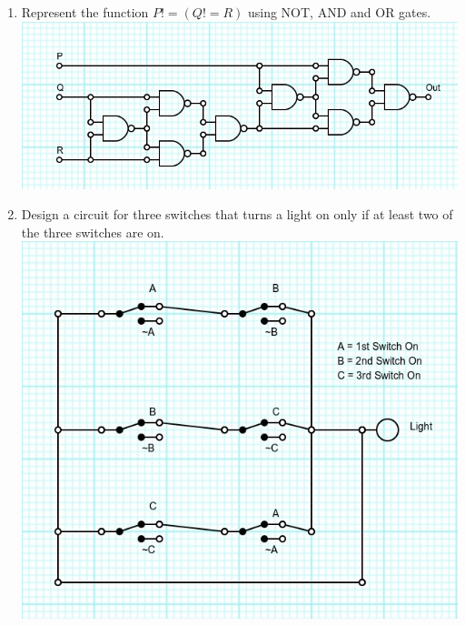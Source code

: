 \documentclass{article}
\begin{document}
\begin{enumerate}
    \newpage
    \item Represent the function $P!=(Q!=R)$ using NOT, AND and OR gates.\\
    \includegraphics[scale=.9]{5}

    \item Design a circuit for three switches that turns a light on only if 
    at least two of the three switches are on.\\
    \includegraphics[scale=1]{6}


\end{enumerate}
\end{document}
